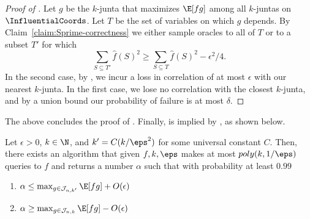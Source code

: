 \begin{proof}[Proof of ]
Let $g$ be the $k$-junta that maximizes $\E[fg]$ among all $k$-juntas on $\InfluentialCoords$.
Let $T$ be the set of  variables on which $g$ depends.
By Claim~\ref{claim:Sprime-correctness} we either sample oracles to all of $T$ or to a subset $T'$ for which $$\sum_{S \subseteq T'} \hat{f}(S)^2 \geq \sum_{S \subseteq T} \hat{f}(S)^2 - \epsilon^2/4.$$
In the second case, by , we incur a loss in correlation of at most $\epsilon$ with our nearest $k$-junta. In the first case, we lose no correlation with the closest $k$-junta, and by a union bound our probability of failure is at most $\delta$.
\end{proof}
The above concludes the proof of . Finally,  is implied by , as shown below.


\begin{theorem}
Let $\epsilon>0$, $k \in \N$, and $k' = C(k/\eps^2)$ for some universal constant $C$. Then, there exists an algorithm that given $f, k, \eps$ makes at most $poly(k, 1 / \eps)$ queries to $f$  and returns a number $\alpha$ such that with probability at least $0.99$
\begin{enumerate}
	\item $\alpha \le \max_{g \in \mathcal{J}_{n,k'}} \E[fg]+O(\epsilon)$
	\item $\alpha \ge \max_{g \in \mathcal{J}_{n,k}} \E[fg]-O(\epsilon)$
\end{enumerate}
\end{theorem}

